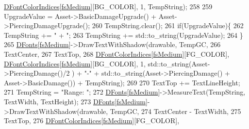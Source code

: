 \begin{DoxyCode}
      \hyperlink{classCUnitDescriptionRenderer_acb9416ccf452db38d4817711cd9d6abb}{DFontColorIndices}[\hyperlink{classCUnitDescriptionRenderer_a3ea4cd83b6dd9533ab3abb953a7da35aa7b5aa12d8a01b317ebfbf1bd65d7e568}{fsMedium}][BG\_COLOR], 1, TempString);
258                         
259                         UpgradeValue = Asset->BasicDamageUpgrade() + Asset->PiercingDamageUpgrade();
260                         TempString.clear();
261                         \textcolor{keywordflow}{if}(UpgradeValue)\{
262                             TempString += \textcolor{stringliteral}{" + "};
263                             TempString += std::to\_string(UpgradeValue);
264                         \}
265                         \hyperlink{classCUnitDescriptionRenderer_a270a545ecdb1602cd2a0a2def8997dc8}{DFonts}[\hyperlink{classCUnitDescriptionRenderer_a3ea4cd83b6dd9533ab3abb953a7da35aa7b5aa12d8a01b317ebfbf1bd65d7e568}{fsMedium}]->DrawTextWithShadow(drawable, TempGC, 
266                             TextCenter, 
267                             TextTop, 
268                             \hyperlink{classCUnitDescriptionRenderer_acb9416ccf452db38d4817711cd9d6abb}{DFontColorIndices}[\hyperlink{classCUnitDescriptionRenderer_a3ea4cd83b6dd9533ab3abb953a7da35aa7b5aa12d8a01b317ebfbf1bd65d7e568}{fsMedium}][FG\_COLOR], 
      \hyperlink{classCUnitDescriptionRenderer_acb9416ccf452db38d4817711cd9d6abb}{DFontColorIndices}[\hyperlink{classCUnitDescriptionRenderer_a3ea4cd83b6dd9533ab3abb953a7da35aa7b5aa12d8a01b317ebfbf1bd65d7e568}{fsMedium}][BG\_COLOR], 1, std::to\_string(Asset->PiercingDamage()/2
      ) + \textcolor{stringliteral}{"-"} + std::to\_string(Asset->PiercingDamage() + Asset->BasicDamage()) + TempString);
269                         
270                         TextTop += TextLineHeight;
271                         TempString = \textcolor{stringliteral}{"Range: "};
272                         \hyperlink{classCUnitDescriptionRenderer_a270a545ecdb1602cd2a0a2def8997dc8}{DFonts}[\hyperlink{classCUnitDescriptionRenderer_a3ea4cd83b6dd9533ab3abb953a7da35aa7b5aa12d8a01b317ebfbf1bd65d7e568}{fsMedium}]->MeasureText(TempString, TextWidth, TextHeight);
273                         \hyperlink{classCUnitDescriptionRenderer_a270a545ecdb1602cd2a0a2def8997dc8}{DFonts}[\hyperlink{classCUnitDescriptionRenderer_a3ea4cd83b6dd9533ab3abb953a7da35aa7b5aa12d8a01b317ebfbf1bd65d7e568}{fsMedium}]->DrawTextWithShadow(drawable, TempGC, 
274                             TextCenter - TextWidth, 
275                             TextTop, 
276                             \hyperlink{classCUnitDescriptionRenderer_acb9416ccf452db38d4817711cd9d6abb}{DFontColorIndices}[\hyperlink{classCUnitDescriptionRenderer_a3ea4cd83b6dd9533ab3abb953a7da35aa7b5aa12d8a01b317ebfbf1bd65d7e568}{fsMedium}][FG\_COLOR], 

\end{DoxyCode}
